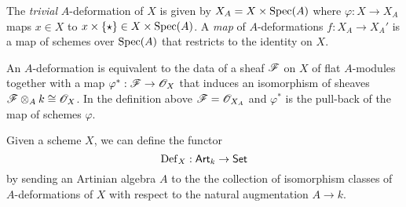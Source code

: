 \documentclass[11pt]{amsart}
\def\Spec{{\rm Spec}}
\begin{document}
The {\em trivial} $A$-deformation of $X$ is given by $X_A = X \times \Spec(A)$ where $\varphi : X \to X_A$ maps $x \in X$ to $x \times \{\star\} \in X \times \Spec(A)$.
A {\em map} of $A$-deformations $f : X_A \to X_A'$ is a map of schemes over $\Spec(A)$ that restricts to the identity on $X$. 

\begin{rmk}\label{rmk: adef}
An $A$-deformation is equivalent to the data of a sheaf $\mathscr F$ on $X$ of flat $A$-modules together with a map $\varphi^* : \mathscr F \to \mathscr O_X$ that induces an isomorphism of sheaves $\mathscr F \otimes_A k \cong \mathscr O_X$. 
In the definition above $\mathscr F = \mathscr O_{X_A}$ and $\varphi^*$ is the pull-back of the map of schemes $\varphi$. 
\end{rmk}

Given a scheme $X$, we can define the functor
\[
{\rm Def}_X : {\sf Art}_k \to {\sf Set}
\]
by sending an Artinian algebra $A$ to the the collection of isomorphism classes of $A$-deformations of $X$ with respect to the natural augmentation $A \to k$. 
\end{document}
